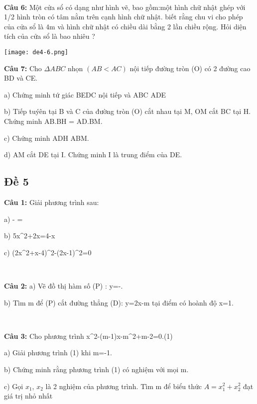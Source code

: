 \documentclass[12pt]{article}
\begin{document}
\

\textbf{Câu 6:} Một cửa sổ có dạng như hình vẽ, bao gồm:một hình chữ nhật ghép với 1/2 hình tròn có tâm nằm trên cạnh hình chữ nhật. biết rằng chu vi cho phép của cửa sổ là 4m và hình chữ nhật có chiều dài bằng 2 lần chiều rộng. Hỏi diện tích của cửa sổ là bao nhiêu ?

\begin{center}
    \texttt{[image: de4-6.png]}
\end{center}

\textbf{Câu 7:} Cho $\Delta ABC$ nhọn $(AB<AC)$ nội tiếp đường tròn (O) có 2 đường cao BD và CE.\par
a) Chứng minh tứ giác BEDC nội tiếp và \Delta ABC \backsim \Delta ADE \par
b) Tiếp tuýên tại B và C của đường tròn (O) cắt nhau tại M, OM cắt BC tại H. Chứng minh AB.BH = AD.BM. \par
c) Chứng minh \Delta ADH \backsim \Delta ABM. \par
d) AM cắt DE tại I. Chứng minh I là trung điểm của DE.

\break

\subsection{Đề 5}

\textbf{Câu 1:} Giải phương trình sau:\par
a)  -  =  \par
b) 5x^2+2x=4-x \par
c) (2x^2+x-4)^2-(2x-1)^2=0 
 
\   

\textbf{Câu 2:} 
a) Vẽ đồ thị hàm số (P) : y=-. \par
b) Tìm m để (P) cắt đường thẳng (D): y=2x-m tại điểm có hoành độ x=1. \par

\   

\textbf{Câu 3:} Cho phương trình x^2-(m-1)x-m^2+m-2=0.(1) \par
a) Giải phương trình (1) khi m=-1. \par
b) Chứng minh rằng phương trình (1) có nghiệm với mọi m. \par
c) Gọi $x_1$, $x_2$ là 2 nghiệm của phương trình. Tìm m để biểu thức $A=x_1^2+x_2^2$ đạt giá trị nhỏ nhất \par

\   
\end{document}
